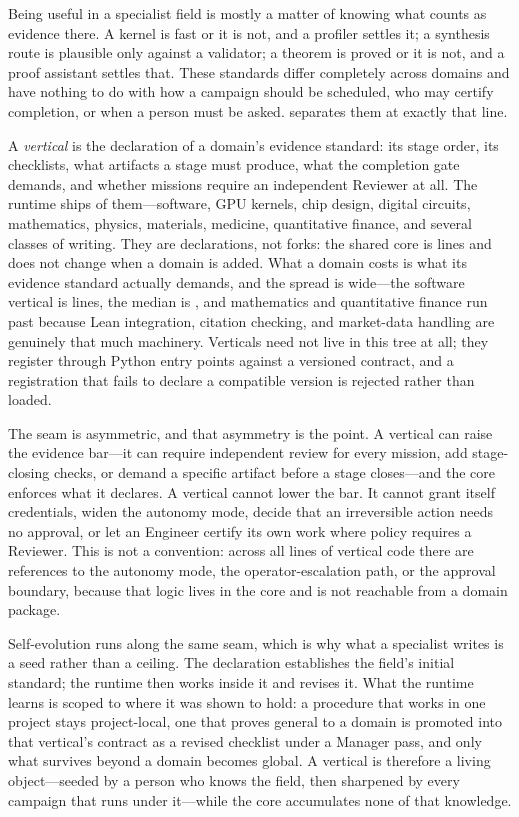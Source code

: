 Being useful in a specialist field is mostly a matter of knowing what counts as
evidence there. A kernel is fast or it is not, and a profiler settles it; a synthesis
route is plausible only against a validator; a theorem is proved or it is not, and a
proof assistant settles that. These standards differ completely across domains and
have nothing to do with how a campaign should be scheduled, who may certify
completion, or when a person must be asked. \systemname{} separates them at exactly
that line.

A \emph{vertical} is the declaration of a domain's evidence standard: its stage
order, its checklists, what artifacts a stage must produce, what the completion gate
demands, and whether missions require an independent Reviewer at all. The runtime
ships \VerticalCount{} of them---software, GPU kernels, chip design, digital
circuits, mathematics, physics, materials, medicine, quantitative finance, and
several classes of writing. They are declarations, not forks: the shared core is
\VerticalCoreLoc{} lines and does not change when a domain is added. What a domain
costs is what its evidence standard actually demands, and the spread is wide---the
software vertical is \VerticalSmallest{} lines, the median is \VerticalMedian{}, and
mathematics and quantitative finance run past \VerticalLargest{} because Lean
integration, citation checking, and market-data handling are genuinely that much
machinery. Verticals need not live in this tree at all; they register through Python
entry points against a versioned contract, and a registration that fails to declare a
compatible version is rejected rather than loaded.

The seam is asymmetric, and that asymmetry is the point. A vertical can raise the
evidence bar---it can require independent review for every mission, add stage-closing
checks, or demand a specific artifact before a stage closes---and the core enforces
what it declares. A vertical cannot lower the bar. It cannot grant itself
credentials, widen the autonomy mode, decide that an irreversible action needs no
approval, or let an Engineer certify its own work where policy requires a Reviewer.
This is not a convention: across all \VerticalTotalLoc{} lines of vertical code there
are \VerticalAuthorityRefs{} references to the autonomy mode, the operator-escalation
path, or the approval boundary, because that logic lives in the core and is not
reachable from a domain package.

Self-evolution runs along the same seam, which is why what a specialist writes is a
seed rather than a ceiling. The declaration establishes the field's initial standard;
the runtime then works inside it and revises it. What the runtime learns is scoped to
where it was shown to hold: a procedure that works in one project stays
project-local, one that proves general to a domain is promoted into that vertical's
contract as a revised checklist under a Manager pass, and only what survives beyond a
domain becomes global. A vertical is therefore a living object---seeded by a person
who knows the field, then sharpened by every campaign that runs under it---while the
core accumulates none of that knowledge.

